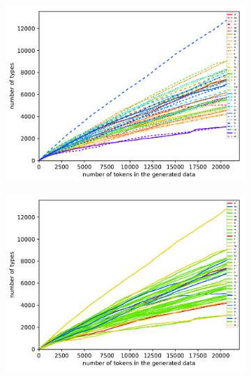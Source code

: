 \documentclass[11pt,a4paper,twoside,openright]{scrbook}
\begin{document}
\begin{figure}[h]
    \centering
    \begin{subfigure}[b]{0.32\textwidth}
    	\centering
        \includegraphics[width=\textwidth]{graphs/gensize_huge_types}
    \end{subfigure}
    \begin{subfigure}[b]{0.32\textwidth}
    	\centering
        \includegraphics[width=\textwidth]{graphs/gensize_huge_types_script}
    \end{subfigure}
    \begin{subfigure}[b]{0.32\textwidth}
    	\centering

\end{subfigure}
\end{figure}
\end{document}
